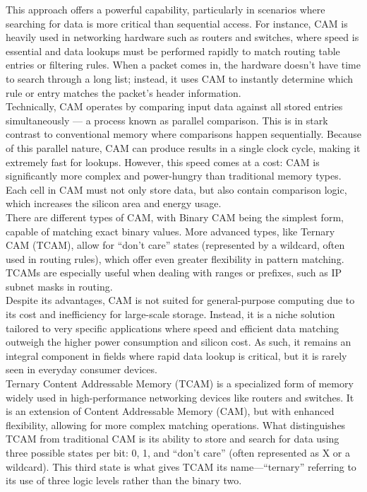 \documentclass{article}
\begin{document}
This approach offers a powerful capability, particularly in scenarios where searching for data is more critical than sequential access. For instance, CAM is heavily used in networking hardware such as routers and switches, where speed is essential and data lookups must be performed rapidly to match routing table entries or filtering rules. When a packet comes in, the hardware doesn’t have time to search through a long list; instead, it uses CAM to instantly determine which rule or entry matches the packet’s header information.\\

Technically, CAM operates by comparing input data against all stored entries simultaneously — a process known as parallel comparison. This is in stark contrast to conventional memory where comparisons happen sequentially. Because of this parallel nature, CAM can produce results in a single clock cycle, making it extremely fast for lookups. However, this speed comes at a cost: CAM is significantly more complex and power-hungry than traditional memory types. Each cell in CAM must not only store data, but also contain comparison logic, which increases the silicon area and energy usage.\\

There are different types of CAM, with Binary CAM being the simplest form, capable of matching exact binary values. More advanced types, like Ternary CAM (TCAM), allow for “don’t care” states (represented by a wildcard, often used in routing rules), which offer even greater flexibility in pattern matching. TCAMs are especially useful when dealing with ranges or prefixes, such as IP subnet masks in routing.\\

Despite its advantages, CAM is not suited for general-purpose computing due to its cost and inefficiency for large-scale storage. Instead, it is a niche solution tailored to very specific applications where speed and efficient data matching outweigh the higher power consumption and silicon cost. As such, it remains an integral component in fields where rapid data lookup is critical, but it is rarely seen in everyday consumer devices.\\

Ternary Content Addressable Memory (TCAM) is a specialized form of memory widely used in high-performance networking devices like routers and switches. It is an extension of Content Addressable Memory (CAM), but with enhanced flexibility, allowing for more complex matching operations. What distinguishes TCAM from traditional CAM is its ability to store and search for data using three possible states per bit: 0, 1, and “don’t care” (often represented as X or a wildcard). This third state is what gives TCAM its name—“ternary” referring to its use of three logic levels rather than the binary two.\\
\end{document}
